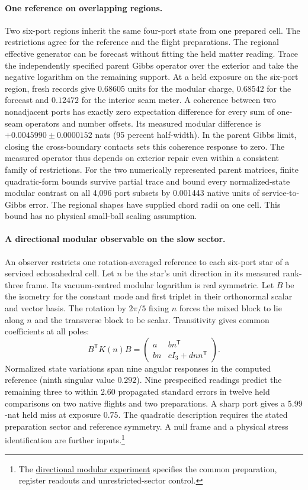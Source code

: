 \documentclass[11pt]{article}
\begin{document}
\paragraph{One reference on overlapping regions.}
Two six-port regions inherit the same four-port state from one prepared
cell. The restrictions agree for the reference and the flight
preparations. The regional effective generator can be forecast without
fitting the held matter reading. Trace the independently specified
parent Gibbs operator over the exterior and take the negative logarithm
on the remaining support. At a held exposure on the six-port region,
fresh records give $0.68605$ units for the modular charge,
$0.68542$ for the forecast and $0.12472$ for the interior seam meter.
A coherence between two nonadjacent ports has exactly zero expectation
difference for every sum of one-seam operators and number offsets.
Its measured modular difference is $+0.0045990\pm0.0000152$ nats
(95 percent half-width). In the parent Gibbs limit, closing the
cross-boundary contacts sets this coherence response to zero.
The measured operator thus depends on exterior repair even within a
consistent family of restrictions. For the two numerically represented parent matrices, finite quadratic-form
bounds survive partial trace and bound every normalized-state modular
contrast on all 4,096 port subsets by 0.001443 native units of
service-to-Gibbs error. The regional shapes have supplied chord radii
on one cell. This bound has no physical small-ball scaling assumption.

\paragraph{A directional modular observable on the slow sector.}
An observer restricts one rotation-averaged reference to each six-port
star of a serviced echosahedral cell. Let $n$ be the star's unit direction
in its measured rank-three frame. Its vacuum-centred modular logarithm is
real symmetric. Let $B$ be the isometry for the constant mode and first
triplet in their orthonormal scalar and vector basis. The rotation by
$2\pi/5$ fixing $n$ forces the mixed block to lie along $n$ and the transverse
block to be scalar. Transitivity gives common coefficients at all poles:
\[
 B^{\mathsf T} K(n) B =
 \begin{pmatrix} a & b n^{\mathsf T} \\ b n & c I_3+d n n^{\mathsf T} \end{pmatrix}.
\]
Normalized state variations span nine angular responses in the computed
reference (ninth singular value $0.292$). Nine prespecified readings
predict the remaining three to within $2.60$ propagated standard errors
in twelve held comparisons on two native flights and two preparations.
A sharp port gives a $5.99$-nat held miss at exposure $0.75$. The quadratic
description requires the stated preparation sector and reference symmetry.
A null frame and a physical stress identification are further inputs.\footnote{The
\href{https://github.com/FloatingPragma/observer-patch-holography/tree/main/model/experiments/interval_echo_angular}{directional modular experiment}
specifies the common preparation, register readouts and unrestricted-sector control.}
\end{document}
